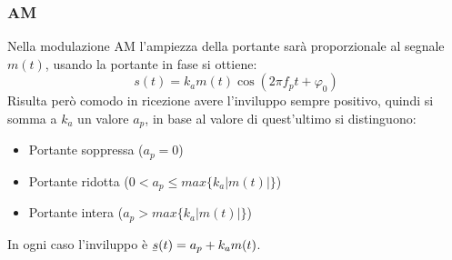 \documentclass{article}
\newcommand{\ubar}[1]{\underaccent{\bar}{#1}}
\begin{document}
\subsubsection{AM}

Nella modulazione AM l'ampiezza della portante sarà proporzionale al segnale $m(t)$, usando la portante in fase si ottiene:
$$s(t)=k_am(t)\cos(2\pi f_pt+\varphi_0)$$
\noindent Risulta però comodo in ricezione avere l'inviluppo sempre positivo, quindi si somma a $k_a$ un valore $a_p$, in base al valore di quest'ultimo si distinguono:
\begin{itemize}
    \item Portante soppressa ($a_p=0$)
    \item Portante ridotta ($0<a_p\leq max\{k_a|m(t)|\}$)
    \item Portante intera ($a_p>max\{k_a|m(t)|\}$)
\end{itemize}

\noindent In ogni caso l'inviluppo è $\ubar{s}(t)=a_p+k_am(t)$.\newline
\end{document}
